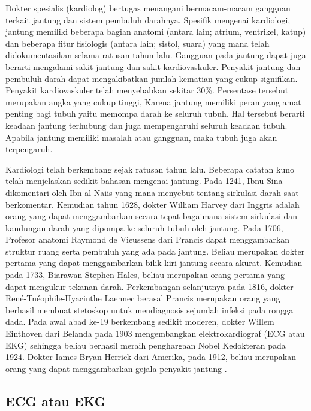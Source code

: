  Dokter spesialis (kardiolog) bertugas menangani bermacam-macam gangguan terkait jantung dan sistem pembuluh darahnya. Spesifik mengenai kardiologi, jantung memiliki beberapa bagian anatomi (antara lain; atrium, ventrikel, katup) dan beberapa fitur fisiologis (antara lain; sistol, suara) yang mana telah didokumentasikan selama ratusan tahun lalu. Gangguan pada jantung dapat juga berarti mengalami sakit jantung dan sakit kardiovaskuler. Penyakit jantung dan pembuluh darah dapat mengakibatkan jumlah kematian yang cukup signifikan. Penyakit kardiovaskuler telah menyebabkan sekitar 30\%. Persentase tersebut merupakan angka yang cukup tinggi,  Karena jantung memiliki peran yang amat penting bagi tubuh yaitu memompa darah ke seluruh tubuh. Hal tersebut berarti keadaan jantung terhubung dan juga mempengaruhi seluruh keadaan tubuh. Apabila jantung memiliki masalah atau gangguan, maka tubuh juga akan terpengaruh.
 \vspace{1ex}
 
 Kardiologi telah berkembang sejak ratusan tahun lalu. Beberapa catatan kuno telah menjelaskan sedikit bahasan mengenai jantung. Pada 1241, Ibnu Sina dikomentari  oleh Ibn al-Naiis yang mana menyebut tentang sirkulasi darah saat berkomentar. Kemudian tahun 1628, dokter William Harvey dari Inggris adalah orang yang dapat menggambarkan secara tepat bagaimana sistem sirkulasi dan kandungan darah yang dipompa ke seluruh tubuh oleh jantung. Pada 1706, Profesor anatomi Raymond de Vieussens dari Prancis dapat menggambarkan struktur ruang serta pembuluh yang ada pada jantung. Beliau merupakan dokter pertama yang dapat menggambarkan bilik kiri jantung secara akurat. Kemudian pada 1733, Biarawan Stephen Hales, beliau merupakan orang pertama yang dapat mengukur tekanan darah. Perkembangan selanjutnya pada 1816, dokter René-Tnéophile-Hyacinthe Laennec berasal Prancis merupakan orang yang berhasil membuat stetoskop untuk mendiagnosis sejumlah infeksi pada rongga dada. Pada awal abad ke-19 berkembang sedikit moderen, dokter Willem Einthoven dari Belanda pada 1903 mengembangkan elektrokardiograf (ECG atau EKG) sehingga beliau berhasil meraih penghargaan Nobel Kedokteran pada 1924. Dokter Iames Bryan Herrick dari Amerika, pada 1912, beliau merupakan orang yang dapat menggambarkan gejala penyakit jantung \cite{cit:12}.
\vspace{1ex}





\subsection{ECG atau EKG}
\vspace{1ex}

